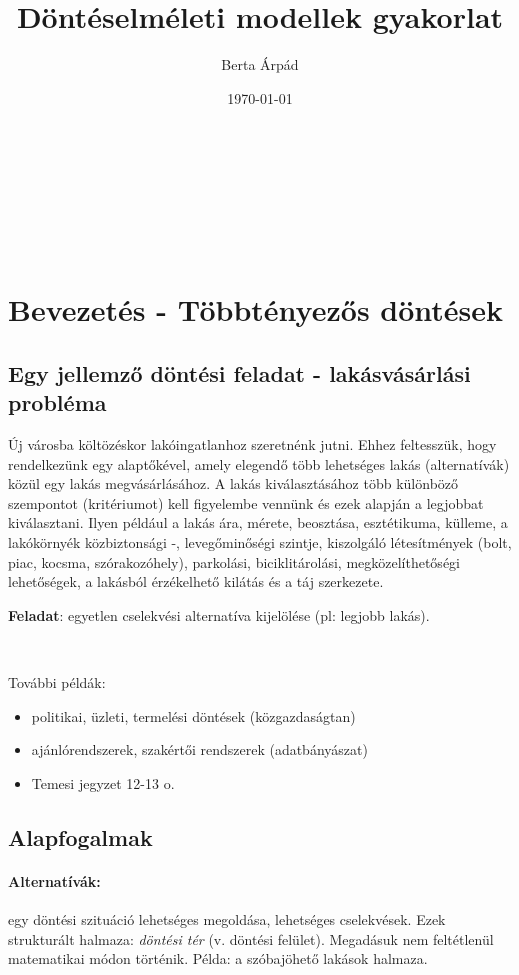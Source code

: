 \documentclass[a4paper,12pt]{article}
\author{Berta Árpád}
\title{Döntéselméleti modellek gyakorlat}
\date{\today}
\begin{document}
\maketitle

\tableofcontents

\

\

\

\section{Bevezetés - Többtényezős döntések}

\subsection{Egy jellemző döntési feladat - lakásvásárlási probléma}

Új városba költözéskor lakóingatlanhoz szeretnénk jutni. Ehhez feltesszük, hogy rendelkezünk egy alaptőkével, amely elegendő több lehetséges lakás (alternatívák) közül egy lakás megvásárlásához. A lakás kiválasztásához több különböző szempontot (kritériumot) kell figyelembe vennünk és ezek alapján a legjobbat kiválasztani. Ilyen például a lakás ára, mérete, beosztása, esztétikuma, külleme, a lakókörnyék közbiztonsági -, levegőminőségi szintje, kiszolgáló létesítmények (bolt, piac, kocsma, szórakozóhely), parkolási, biciklitárolási, megközelíthetőségi lehetőségek, a lakásból érzékelhető kilátás és a táj szerkezete.

\textbf{Feladat}: egyetlen cselekvési alternatíva kijelölése (pl: legjobb lakás). 

\

További példák: 
\begin{itemize}
\item politikai, üzleti, termelési döntések (közgazdaságtan)
\item ajánlórendszerek, szakértői rendszerek (adatbányászat) 
\item Temesi jegyzet 12-13 o. 
\end{itemize}

\subsection{Alapfogalmak}

\paragraph{Alternatívák:} egy döntési szituáció lehetséges megoldása, lehetséges cselekvések. Ezek strukturált halmaza: \emph{döntési tér} (v. döntési felület). Megadásuk nem feltétlenül matematikai módon történik. Példa: a szóbajöhető lakások halmaza.
\end{document}
